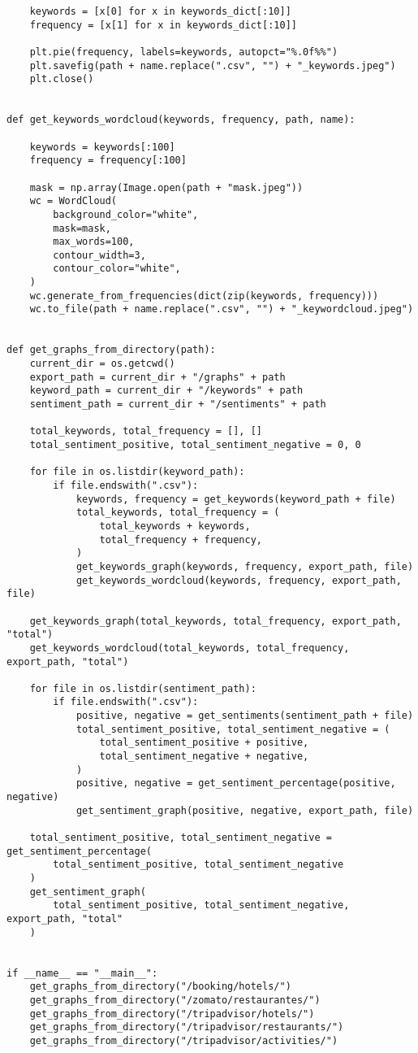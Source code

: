 \begin{verbatim}
    keywords = [x[0] for x in keywords_dict[:10]]
    frequency = [x[1] for x in keywords_dict[:10]]

    plt.pie(frequency, labels=keywords, autopct="%.0f%%")
    plt.savefig(path + name.replace(".csv", "") + "_keywords.jpeg")
    plt.close()


def get_keywords_wordcloud(keywords, frequency, path, name):

    keywords = keywords[:100]
    frequency = frequency[:100]

    mask = np.array(Image.open(path + "mask.jpeg"))
    wc = WordCloud(
        background_color="white",
        mask=mask,
        max_words=100,
        contour_width=3,
        contour_color="white",
    )
    wc.generate_from_frequencies(dict(zip(keywords, frequency)))
    wc.to_file(path + name.replace(".csv", "") + "_keywordcloud.jpeg")


def get_graphs_from_directory(path):
    current_dir = os.getcwd()
    export_path = current_dir + "/graphs" + path
    keyword_path = current_dir + "/keywords" + path
    sentiment_path = current_dir + "/sentiments" + path

    total_keywords, total_frequency = [], []
    total_sentiment_positive, total_sentiment_negative = 0, 0

    for file in os.listdir(keyword_path):
        if file.endswith(".csv"):
            keywords, frequency = get_keywords(keyword_path + file)
            total_keywords, total_frequency = (
                total_keywords + keywords,
                total_frequency + frequency,
            )
            get_keywords_graph(keywords, frequency, export_path, file)
            get_keywords_wordcloud(keywords, frequency, export_path, file)

    get_keywords_graph(total_keywords, total_frequency, export_path, "total")
    get_keywords_wordcloud(total_keywords, total_frequency, export_path, "total")

    for file in os.listdir(sentiment_path):
        if file.endswith(".csv"):
            positive, negative = get_sentiments(sentiment_path + file)
            total_sentiment_positive, total_sentiment_negative = (
                total_sentiment_positive + positive,
                total_sentiment_negative + negative,
            )
            positive, negative = get_sentiment_percentage(positive, negative)
            get_sentiment_graph(positive, negative, export_path, file)

    total_sentiment_positive, total_sentiment_negative = get_sentiment_percentage(
        total_sentiment_positive, total_sentiment_negative
    )
    get_sentiment_graph(
        total_sentiment_positive, total_sentiment_negative, export_path, "total"
    )


if __name__ == "__main__":
    get_graphs_from_directory("/booking/hotels/")
    get_graphs_from_directory("/zomato/restaurantes/")
    get_graphs_from_directory("/tripadvisor/hotels/")
    get_graphs_from_directory("/tripadvisor/restaurants/")
    get_graphs_from_directory("/tripadvisor/activities/")

\end{verbatim}